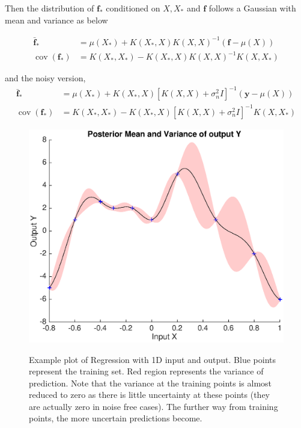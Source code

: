 \documentclass[11pt]{report}
\numberwithin{equation}{chapter}
\begin{document}
\begin{spacing}{2}
Then the distribution of $\mathbf{f}_\ast$ conditioned on $X, X_\ast$ and $\mathbf{f}$ follows a Gaussian with mean and variance as below

\begin{align}
\label{predictive_mean_noise_free}
\bar{\mathbf{f}}_\ast & = \mu(X_\ast) + K(X_\ast, X)K(X,X)^{-1}(\mathbf{f} - \mu(X))
\\
\label{predictive_covariance_noise_free}
\operatorname{cov}(\mathbf{f}_\ast) & = K(X_\ast, X_\ast) - K(X_\ast, X)K(X, X)^{-1}K(X, X_\ast)
\end{align}
 
and the noisy version,
\begin{align}
\bar{\mathbf{f}}_\ast & = \mu(X_\ast) + K(X_\ast, X)[K(X,X) + \sigma_n^2I]^{-1}(\mathbf{y} - \mu (X))
\\
\operatorname{cov}(\mathbf{f}_\ast) & = K(X_\ast, X_\ast) - K(X_\ast, X)[K(X,X) + \sigma_n^2I]^{-1}K(X, X_\ast)
\end{align}

\begin{figure}[h]
\centering
\includegraphics[scale = 0.55]{RegressionPlot1D.eps}
\label{regression_1D_plot}
\caption{Example plot of Regression with 1D input and output. Blue points represent the training set. Red region represents the variance of prediction. Note that the variance at the training points is almost reduced to zero as there is little uncertainty at these points (they are actually zero in noise free cases). The further way from training points, the more uncertain predictions become.}
\end{figure}


\end{spacing}
\end{document}
